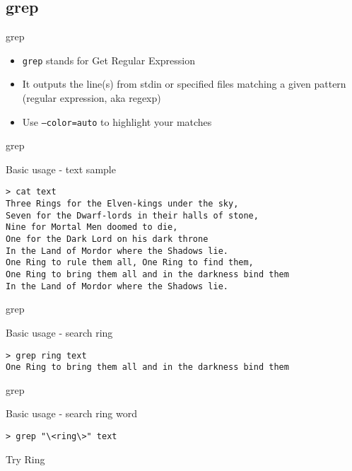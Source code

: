 \subsection{grep}
\begin{frame}[fragile]{grep}
\begin{itemize}
  \item \texttt{grep} stands for Get Regular Expression
  \pause
  \item It outputs the line(s) from stdin or specified files matching a given pattern (regular expression, aka regexp)
  \pause
  \item Use \texttt{--color=auto} to highlight your matches
\end{itemize}
\end{frame}

\begin{frame}[fragile]{grep}
  \begin{exampleblock}{Basic usage - text sample}
    \begin{lstlisting}[showstringspaces=false,basicstyle=\tiny]
> cat text
Three Rings for the Elven-kings under the sky,
Seven for the Dwarf-lords in their halls of stone,
Nine for Mortal Men doomed to die,
One for the Dark Lord on his dark throne
In the Land of Mordor where the Shadows lie.
One Ring to rule them all, One Ring to find them,
One Ring to bring them all and in the darkness bind them
In the Land of Mordor where the Shadows lie.
    \end{lstlisting}
  \end{exampleblock}
\end{frame}

\begin{frame}[fragile]{grep}
  \begin{exampleblock}{Basic usage - search ring}
    \begin{lstlisting}[showstringspaces=false,basicstyle=\tiny]
> grep ring text
One Ring to bring them all and in the darkness bind them
    \end{lstlisting}
  \end{exampleblock}
\end{frame}


\begin{frame}[fragile]{grep}
  \begin{exampleblock}{Basic usage - search ring word}
    \begin{lstlisting}[showstringspaces=false,basicstyle=\tiny]
> grep "\<ring\>" text
    \end{lstlisting}
  \end{exampleblock}
  \pause
  Try Ring
\end{frame}



